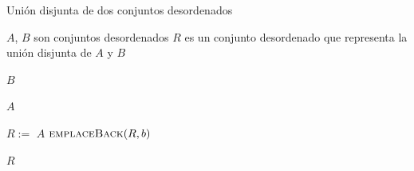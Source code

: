 \begin{algorithm}
\caption{Unión disjunta de dos conjuntos desordenados}\label{alg:disjointcupDes}
\begin{algorithmic}[1]
\Require $A$, $B$ son conjuntos desordenados
\Ensure $R$ es un conjunto desordenado que representa la unión disjunta de $A$ y $B$

  \State \Return $B$
\EndIf

  \State \Return $A$
\EndIf

\State $R :=$ $A$
  \State $\Call{emplaceBack}{R,b}$
\EndFor

\State \Return $R$
\EndFunction
\end{algorithmic}
\end{algorithm}

